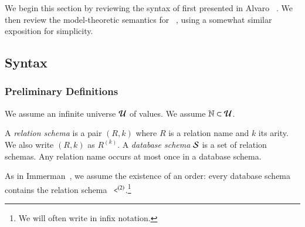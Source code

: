 
We begin this section by reviewing the syntax of \lang first presented
in Alvaro \etal~\cite{dedalus}. We then review the model-theoretic semantics for \lang~\cite{ameloot-operational}, using a somewhat similar exposition for simplicity.


\subsection{Syntax}

\subsubsection{Preliminary Definitions}


We assume an infinite universe $\univ$ of values.  We assume $\mathbb{N} \subset \univ$.

A {\em relation schema} is a pair $(R,k)$ where $R$ is a relation name and $k$ its arity.  We also write $(R,k)$ as $R^{(k)}$.
A {\em database schema} $\schema$ is a set of relation schemas.  Any relation name occurs at most once in a database schema.

As in Immerman~\cite{immerman-ptime}, we assume
the existence of an order: every database schema contains the relation schema
$\dedalus{<}^{(2)}$.\footnote{We will often write \dedalus{<} in infix notation.}  

